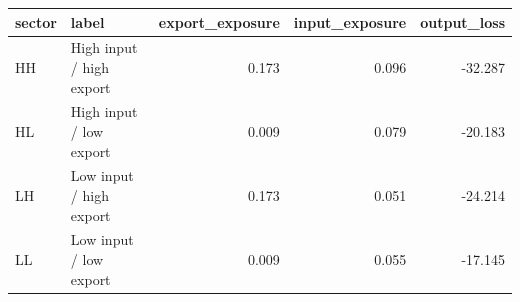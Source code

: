 \begin{tabular}{llrrr}
\toprule
sector & label & export_exposure & input_exposure & output_loss \\
\midrule
HH & High input / high export & 0.173 & 0.096 & -32.287 \\
HL & High input / low export & 0.009 & 0.079 & -20.183 \\
LH & Low input / high export & 0.173 & 0.051 & -24.214 \\
LL & Low input / low export & 0.009 & 0.055 & -17.145 \\
\bottomrule
\end{tabular}
